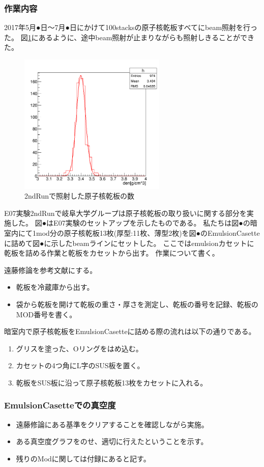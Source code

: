 \documentclass[12pt,a4paper]{jarticle}
\begin{document}
\subsubsection{作業内容}
2017年5月●日～7月●日にかけて100stacksの原子核乾板すべてにbeam照射を行った。
図\ref{fig:beam_day}にあるように、途中beam照射が止まりながらも照射しきることができた。
\begin{figure}[htbp]
  \centering
     \includegraphics[width=70mm]{thick75_den.png}
  \caption{2ndRunで照射した原子核乾板の数\label{fig:beam_day}}
\end{figure}
E07実験2ndRunで岐阜大学グループは原子核乾板の取り扱いに関する部分を実施した。
図●はE07実験のセットアップを示したものである。
私たちは図●の暗室内にて1mod分の原子核乾板13枚(厚型:11枚、薄型2枚)を図●のEmulsionCasetteに詰めて図●に示したbeamラインにセットした。
ここではemulsionカセットに乾板を詰める作業と乾板をカセットから出す。
作業について書く。
\par
遠藤修論を参考文献にする。
\begin{itemize}
 \item 乾板を冷蔵庫から出す。
 \item 袋から乾板を開けて乾板の重さ・厚さを測定し、乾板の番号を記録、乾板のMOD番号を書く。
\end{itemize}
暗室内で原子核乾板をEmulsionCasetteに詰める際の流れは以下の通りである。
\begin{enumerate}
    \item グリスを塗った、Oリングをはめ込む。
    \item カセットの4つ角にL字のSUS板を置く。 
    \item 乾板をSUS板に沿って原子核乾板13枚をカセットに入れる。
\end{enumerate}
\subsubsection{EmulsionCasetteでの真空度}
\begin{itemize}
 \item 遠藤修論にある基準をクリアすることを確認しながら実施。
 \item ある真空度グラフをのせ、適切に行えたということを示す。
 \item 残りのModに関しては付録にあると記す。
\end{itemize}
\end{document}
